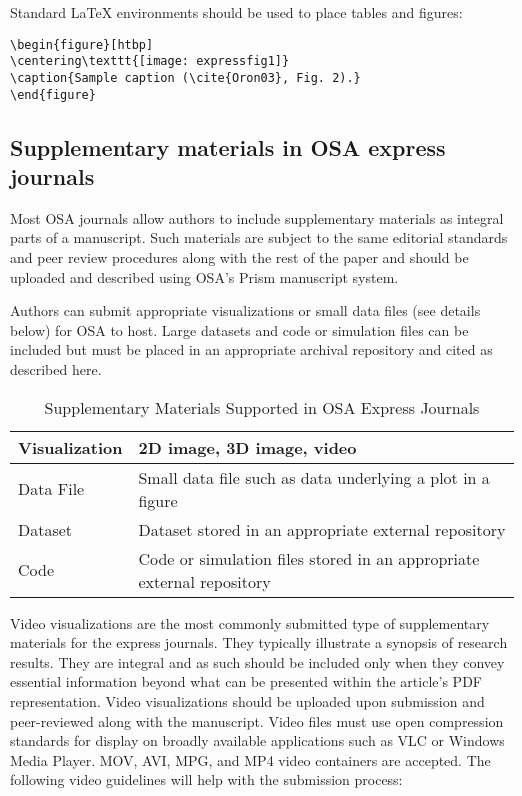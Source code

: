 \documentclass[10pt]{article}
\begin{document}
\noindent Standard \LaTeX{} environments should be used to place tables and figures:
\begin{verbatim}
\begin{figure}[htbp]
\centering\texttt{[image: expressfig1]}
\caption{Sample caption (\cite{Oron03}, Fig. 2).}
\end{figure}
\end{verbatim}

\subsection{Supplementary materials in OSA express journals}

Most OSA journals allow authors to include supplementary materials as integral parts of a manuscript. Such materials are subject to the same editorial standards and peer review procedures along with the rest of the paper and should be uploaded and described using OSA's Prism manuscript system.

Authors can submit appropriate visualizations or small data files (see details below) for OSA to host. Large datasets and code or simulation files can be included but must be placed in an appropriate archival repository and cited as described here.

\begin{table}[ht!]
\centering
\caption{Supplementary Materials Supported in OSA Express Journals}
\begin{tabular}{|l|l|}
\hline
Visualization & 2D image, 3D image, video \\ \hline
Data File     & Small data file such as data underlying a plot in a figure \\ \hline
Dataset       & Dataset stored in an appropriate external repository \\ \hline
Code          & Code or simulation files stored in an appropriate external repository \\
\hline
\end{tabular}
\end{table}

Video visualizations are the most commonly submitted type of supplementary materials for the express journals. They typically illustrate a synopsis of research results. They are integral and as such should be included only when they convey essential information beyond what can be presented within the article's PDF representation. Video visualizations should be uploaded upon submission and peer-reviewed along with the manuscript. Video files must use open compression standards for display on broadly available applications such as VLC or Windows Media Player. MOV, AVI, MPG, and MP4 video containers are accepted. The following video guidelines will help with the submission process:
\end{document}
